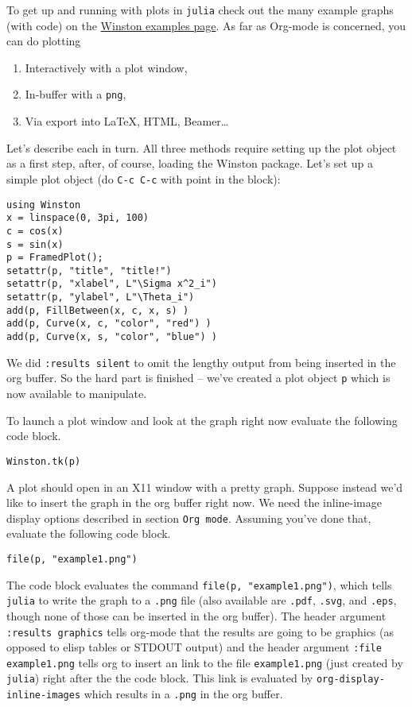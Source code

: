 \documentclass[11pt]{article}
\begin{document}
To get up and running with plots in \texttt{julia} check out the many example graphs (with code) on the \href{https://github.com/nolta/Winston.jl/blob/master/doc/examples.md}{Winston examples page}. As far as Org-mode is concerned, you can do plotting

\begin{enumerate}
\item Interactively with a plot window,
\item In-buffer with a \texttt{png},
\item Via export into \LaTeX{}, HTML, Beamer\ldots{}
\end{enumerate}

Let's describe each in turn.  All three methods require setting up the plot object as a first step, after, of course, loading the Winston package.  Let's set up a simple plot object (do \texttt{C-c C-c} with point in the block):

\begin{verbatim}
using Winston
x = linspace(0, 3pi, 100)
c = cos(x)
s = sin(x)
p = FramedPlot();
setattr(p, "title", "title!")
setattr(p, "xlabel", L"\Sigma x^2_i")
setattr(p, "ylabel", L"\Theta_i")
add(p, FillBetween(x, c, x, s) )
add(p, Curve(x, c, "color", "red") )
add(p, Curve(x, s, "color", "blue") )
\end{verbatim}

We did \texttt{:results silent} to omit the lengthy output from being inserted in the org buffer.  So the hard part is finished -- we've created a plot object \texttt{p} which is now available to manipulate.

To launch a plot window and look at the graph right now evaluate the following code block.

\begin{verbatim}
Winston.tk(p)
\end{verbatim}

A plot should open in an X11 window with a pretty graph. Suppose instead we'd like to insert the graph in the org buffer right now. We need the inline-image display options described in section \texttt{Org mode}. Assuming you've done that, evaluate the following code block.

\begin{verbatim}
file(p, "example1.png")
\end{verbatim}

The code block evaluates the command \texttt{file(p, "example1.png")}, which tells \texttt{julia} to write the graph to a \texttt{.png} file (also available are \texttt{.pdf}, \texttt{.svg}, and \texttt{.eps}, though none of those can be inserted in the org buffer).  The header argument \texttt{:results graphics} tells org-mode that the results are going to be graphics (as opposed to elisp tables or STDOUT output) and the header argument \texttt{:file example1.png} tells org to insert an link to the file \texttt{example1.png} (just created by \texttt{julia}) right after the the code block.  This link is evaluated by \texttt{org-display-inline-images} which results in a \texttt{.png} in the org buffer.
\end{document}

